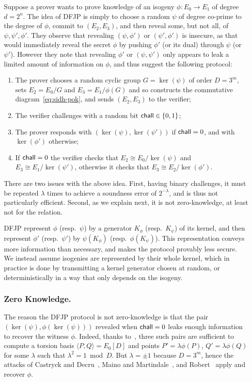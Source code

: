 Suppose a prover wants to prove knowledge of an isogeny $\phi : E_0 \to E_1$ of degree $d = 2^n$.
The idea of DFJP is simply to choose a random $\psi$ of degree co-prime to the degree of $\phi$, commit to $(E_2,E_3)$, and then reveal some, but not all, of $\psi,\psi',\phi'$.
They observe that revealing $(\psi,\phi')$ or $(\psi',\phi')$ is insecure, as that would immediately reveal the secret $\phi$ by pushing $\phi'$ (or its dual) through $\psi$ (or $\psi'$).
However they note that revealing $\phi'$ or $(\psi,\psi')$ only appears to leak a limited amount of information on $\phi$, and thus suggest the following protocol:
\begin{enumerate}
    \item The prover chooses a random cyclic group $G = \ker(\psi)$ of order $D=3^m$, sets $E_2=E_0/G$ and $E_3 = E_1/\phi(G)$ and so constructs the commutative diagram~\eqref{eq:sidh-pok}, and sends $(E_2,E_3)$ to the verifier;
    \item The verifier challenges with a random bit $\mathsf{chall}\in\{0,1\}$;
    \item The prover responds with $(\ker(\psi),\ker(\psi'))$ if $\mathsf{chall}=0$, and with $\ker(\phi')$ otherwise;
    \item If $\mathsf{chall}=0$ the verifier checks that $E_2 \cong E_0/\ker(\psi)$ and $E_3 \cong E_1/\ker(\psi')$, otherwise it checks that $E_3 \cong E_2/\ker(\phi')$.
\end{enumerate}

There are two issues with the above idea.
First, having binary challenges, it must be repeated $\lambda$ times to achieve a soundness error of $2^{-\lambda}$, and is thus not particularly efficient.
Second, as we explain next, it is not zero-knowledge, at least not for the \R[deg] relation.

\begin{remark}
    DFJP represent $\phi$ (resp.\ $\psi$) by a generator $K_\phi$ (resp.\ $K_\psi$) of its kernel, and then represent $\phi'$ (resp.\ $\psi'$) by $\psi(K_\phi)$ (resp.\ $\phi(K_\psi)$). This representation conveys more information than necessary, and makes the protocol provably less secure. We instead assume isogenies are represented by their whole kernel, which in practice is done by transmitting a kernel generator chosen at random, or deterministically in a way that only depends on the isogeny.
\end{remark}

\subsubsection{Zero Knowledge.} 
The reason the DFJP protocol is not zero-knowledge is that the pair $(\ker(\psi), \phi(\ker(\psi)))$ revealed when $\mathsf{chall} = 0$ leaks enough information to recover the witness $\phi$.
Indeed, thanks to~\cite[Lemma~1]{10.1007/978-3-030-95312-6_14}, three such pairs are sufficient to compute a torsion basis $\langle P,Q\rangle = E_0[D]$ and points $P' = \lambda\phi(P)$, $Q' = \lambda\phi(Q)$ for some $\lambda$ such that $\lambda^2 = 1 \bmod D$.
But $\lambda = \pm 1$ because $D = 3^m$, hence the attacks of Castryck and Decru~\cite{CD22}, Maino and Martindale~\cite{MM22}, and Robert~\cite{Rob22} apply and recover $\phi$.

